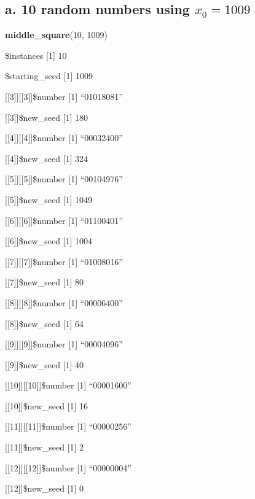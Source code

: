 \documentclass[]{article}
\newenvironment{Shaded}{\begin{snugshade}}{\end{snugshade}}
\newcommand{\KeywordTok}[1]{\textcolor[rgb]{0.13,0.29,0.53}{\textbf{{#1}}}}
\newcommand{\DecValTok}[1]{\textcolor[rgb]{0.00,0.00,0.81}{{#1}}}
\newcommand{\NormalTok}[1]{{#1}}
\begin{document}
\subsection{\texorpdfstring{a. 10 random numbers using
\(x_0 = 1009\)}{a. 10 random numbers using x\_0 = 1009}}\label{a.-10-random-numbers-using-x_0-1009}

\begin{Shaded}
\begin{Highlighting}[]
\KeywordTok{middle_square}\NormalTok{(}\DecValTok{10}\NormalTok{, }\DecValTok{1009}\NormalTok{)}
\end{Highlighting}
\end{Shaded}

\$instances {[}1{]} 10

\$starting\_seed {[}1{]} 1009

{[}{[}3{]}{]}{[}{[}3{]}{]}\$number {[}1{]} ``01018081''

{[}{[}3{]}{]}\$new\_seed {[}1{]} 180

{[}{[}4{]}{]}{[}{[}4{]}{]}\$number {[}1{]} ``00032400''

{[}{[}4{]}{]}\$new\_seed {[}1{]} 324

{[}{[}5{]}{]}{[}{[}5{]}{]}\$number {[}1{]} ``00104976''

{[}{[}5{]}{]}\$new\_seed {[}1{]} 1049

{[}{[}6{]}{]}{[}{[}6{]}{]}\$number {[}1{]} ``01100401''

{[}{[}6{]}{]}\$new\_seed {[}1{]} 1004

{[}{[}7{]}{]}{[}{[}7{]}{]}\$number {[}1{]} ``01008016''

{[}{[}7{]}{]}\$new\_seed {[}1{]} 80

{[}{[}8{]}{]}{[}{[}8{]}{]}\$number {[}1{]} ``00006400''

{[}{[}8{]}{]}\$new\_seed {[}1{]} 64

{[}{[}9{]}{]}{[}{[}9{]}{]}\$number {[}1{]} ``00004096''

{[}{[}9{]}{]}\$new\_seed {[}1{]} 40

{[}{[}10{]}{]}{[}{[}10{]}{]}\$number {[}1{]} ``00001600''

{[}{[}10{]}{]}\$new\_seed {[}1{]} 16

{[}{[}11{]}{]}{[}{[}11{]}{]}\$number {[}1{]} ``00000256''

{[}{[}11{]}{]}\$new\_seed {[}1{]} 2

{[}{[}12{]}{]}{[}{[}12{]}{]}\$number {[}1{]} ``00000004''

{[}{[}12{]}{]}\$new\_seed {[}1{]} 0
\end{document}

